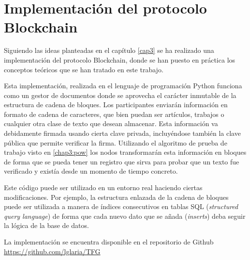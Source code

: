 \cleardoublepage

\chapter{Implementación del protocolo Blockchain}\label{implementacion}
Siguiendo las ideas planteadas en el capítulo \ref{cap3} se ha realizado una implementación del protocolo Blockchain, donde se han puesto en práctica los conceptos teóricos que se han tratado en este trabajo. 


Esta implementación, realizada en el lenguaje de programación Python funciona como un gestor de documentos donde se aprovecha el carácter inmutable de la estructura de cadena de bloques. Los participantes enviarán información en formato de cadena de caracteres, que bien puedan ser artículos, trabajos o cualquier otra clase de texto que desean almacenar. Esta información va debidamente firmada usando cierta clave privada, incluyéndose también la clave pública que permite verificar la firma. Utilizando el algoritmo de prueba de trabajo visto en \ref{chap3:pow} los nodos transformarán esta información en bloques de forma que se pueda tener un registro que sirva para probar que un texto fue verificado y existía desde un momento de tiempo concreto.

Este código puede ser utilizado en un entorno real haciendo ciertas modificaciones. Por ejemplo, la estructura enlazada de la cadena de bloques puede ser utilizada a manera de índices consecutivos en tablas SQL (\textit{structured query language}) de forma que cada nuevo dato que se añada (\textit{inserts}) deba seguir la lógica de la base de datos.



La implementación se encuentra disponible en el repositorio de Github \url{https://github.com/lglaria/TFG}

